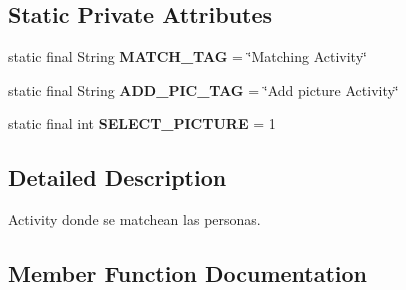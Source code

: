 \subsection*{Static Private Attributes}
\begin{DoxyCompactItemize}
\item 
static final String {\bfseries M\+A\+T\+C\+H\+\_\+\+T\+AG} = \char`\"{}Matching Activity\char`\"{}\hypertarget{classcom_1_1example_1_1sebastian_1_1tindertp_1_1MatchingActivity_a07c539a5cb7211044f917c0254b981aa}{}\label{classcom_1_1example_1_1sebastian_1_1tindertp_1_1MatchingActivity_a07c539a5cb7211044f917c0254b981aa}

\item 
static final String {\bfseries A\+D\+D\+\_\+\+P\+I\+C\+\_\+\+T\+AG} = \char`\"{}Add picture Activity\char`\"{}\hypertarget{classcom_1_1example_1_1sebastian_1_1tindertp_1_1MatchingActivity_a073a3e24e15ba382122725abb4b9bec4}{}\label{classcom_1_1example_1_1sebastian_1_1tindertp_1_1MatchingActivity_a073a3e24e15ba382122725abb4b9bec4}

\item 
static final int {\bfseries S\+E\+L\+E\+C\+T\+\_\+\+P\+I\+C\+T\+U\+RE} = 1\hypertarget{classcom_1_1example_1_1sebastian_1_1tindertp_1_1MatchingActivity_a7b1eb5ab692a38b510f610456d6e4d3c}{}\label{classcom_1_1example_1_1sebastian_1_1tindertp_1_1MatchingActivity_a7b1eb5ab692a38b510f610456d6e4d3c}

\end{DoxyCompactItemize}


\subsection{Detailed Description}
Activity donde se matchean las personas. 

\subsection{Member Function Documentation}
